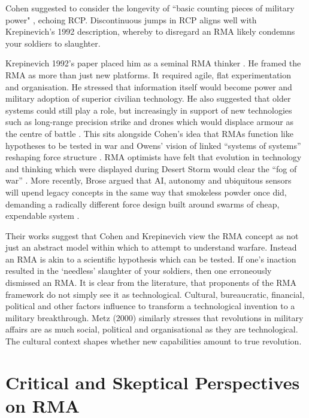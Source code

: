 Cohen suggested to consider the longevity of ``basic counting pieces of
military power"  \parencite{COHEN_1995}, echoing RCP. Discontinuous jumps in RCP aligns well with Krepinevich's 1992 description, whereby to disregard an RMA likely condemns your soldiers to slaughter. 

Krepinevich 1992's paper placed him as a seminal RMA thinker \nocite{KREP_1992}. He framed the RMA as more than just new platforms. It required agile, flat experimentation and organisation. He stressed that information itself would become power and military adoption of superior civilian technology. He also suggested that older systems could still play a role, but increasingly in support of new technologies such as long-range precision strike and drones which would displace armour as the centre of battle \nocite{KREP_1992}. %
 This sits alongside Cohen’s idea that RMAs function like hypotheses to be tested in war \parencite{COHEN_1996} and Owens’ vision of linked “systems of systems” reshaping force structure \parencite{OWENS_2002}. RMA optimists have felt that evolution in technology and thinking which were displayed during Desert Storm would clear the ``fog of war''  \parencite[p.~49]{ALACH_2008}. More recently, Brose argued that AI, autonomy and ubiquitous sensors will upend legacy concepts in the same way that smokeless powder once did, demanding a radically different force design built around swarms of cheap, expendable system \parencite{BROSE_2019}.

Their works suggest that Cohen and Krepinevich view the RMA concept as not just an abstract model within which to attempt to understand warfare. Instead an RMA is akin to a scientific hypothesis which can be tested. If one's inaction resulted in the `needless' slaughter of your soldiers, then one erroneously dismissed an RMA. It is clear from the literature, that proponents of the RMA framework do not simply see it as technological. Cultural, bureaucratic, financial, political and other factors influence to transform a technological invention to a military breakthrough. Metz (2000) similarly stresses that revolutions in military affairs are as much social, political and organisational as they are technological\nocite{METZ_2000}. The cultural context shapes whether new capabilities amount to true revolution.

\section{Critical and Skeptical Perspectives on RMA}

